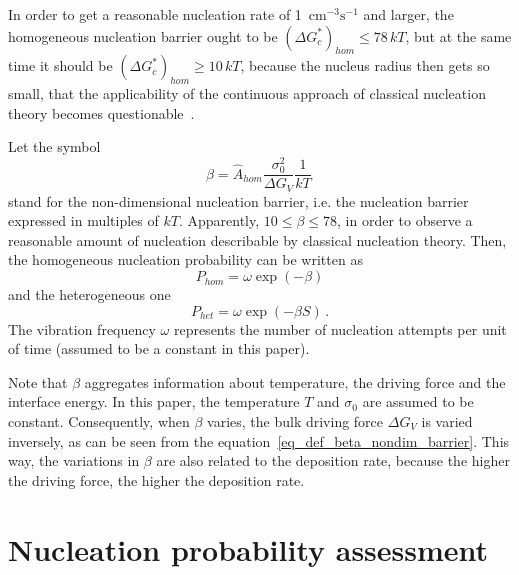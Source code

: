 In order to get a reasonable nucleation rate of 1~$\mathrm{cm^{-3}s^{-1}}$ and larger, the homogeneous nucleation barrier ought to be $(\Delta G_c^*)_{hom}\leq78\,kT$, but at the same time it should be $(\Delta G_c^*)_{hom}\geq10\,kT$, because the nucleus radius then gets so small, that the applicability of the continuous approach of classical nucleation theory becomes questionable~\cite[pp.195]{Porter2009}. 

Let the symbol 
\begin{equation}\label{eq_def_beta_nondim_barrier}
	\beta = \hat{A}_{hom}\frac{\sigma_0^2}{\Delta G_V}\frac{1}{kT}\,
\end{equation}
stand for the non-dimensional nucleation barrier, i.e. the nucleation barrier expressed in multiples of $kT$. Apparently, $10\leq\beta\leq78$, in order to observe a reasonable amount of nucleation describable by classical nucleation theory. Then, the homogeneous nucleation probability can be written as
\begin{equation}
	P_{hom} = \omega\exp(-\beta)
\end{equation}
and the heterogeneous one
\begin{equation}
	P_{het} = \omega\exp(-\beta S) \,.
\end{equation}
The vibration frequency $\omega$ represents the number of nucleation attempts per unit of time (assumed to be a constant in this paper).

Note that $\beta$ aggregates information about temperature, the driving force and the interface energy. In this paper, the temperature $T$ and $\sigma_0$ are assumed to be constant. Consequently, when $\beta$ varies, the bulk driving force $\Delta G_V$ is varied inversely, as can be seen from the equation~\eqref{eq_def_beta_nondim_barrier}. This way, the variations in $\beta$ are also related to the deposition rate, because the higher the driving force, the higher the deposition rate.    

\section{Nucleation probability assessment} \label{sec_NPA}
